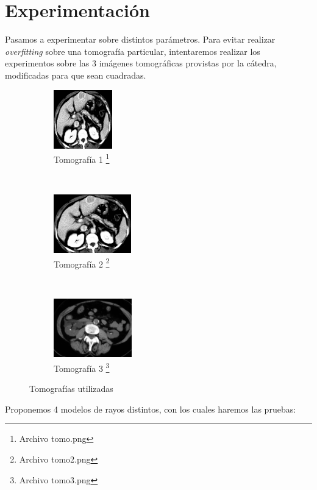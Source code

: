 \section{Experimentación}
\label{sec:experimentacion}

Pasamos a experimentar sobre distintos parámetros.
Para evitar realizar \textit{overfitting} sobre una tomografía particular,
intentaremos realizar los experimentos sobre las
3 imágenes tomográficas provistas por la cátedra,
modificadas para que sean cuadradas.

\begin{figure}[H]
	\centering
    \begin{subfigure}[t]{0.3\textwidth}
        \centering
        \includegraphics[height=1.0in]{../data/tomo.png}
        \caption{Tomografía 1 \footnote{Archivo tomo.png}}
    \end{subfigure}
    ~ 
    \begin{subfigure}[t]{0.3\textwidth}
        \centering
        \includegraphics[height=1.0in]{../data/tomo2.png}
        \caption{Tomografía 2 \footnote{Archivo tomo2.png}}
	\label{tomo:2}
    \end{subfigure}
    ~ 
    \begin{subfigure}[t]{0.3\textwidth}
        \centering
        \includegraphics[height=1.0in]{../data/tomo3.png}
        \caption{Tomografía 3 \footnote{Archivo tomo3.png}}
    \end{subfigure}
    \caption{Tomografías utilizadas}
	\label{fig:tomos}
\end{figure}

Proponemos 4 modelos de rayos distintos, con los cuales haremos las pruebas:

